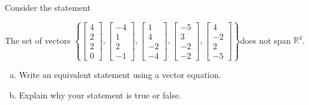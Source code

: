 
\begin{exerciseStatement}


Consider the statement 
\begin{center}\begin{minipage}{0.8\textwidth}
 The set of vectors \( \left\{ \left[\begin{array}{c}
4 \\
2 \\
2 \\
0
\end{array}\right] , \left[\begin{array}{c}
-4 \\
1 \\
2 \\
-1
\end{array}\right] , \left[\begin{array}{c}
1 \\
4 \\
-2 \\
-4
\end{array}\right] , \left[\begin{array}{c}
-5 \\
3 \\
-2 \\
-2
\end{array}\right] , \left[\begin{array}{c}
4 \\
-2 \\
2 \\
-5
\end{array}\right] \right\} \)does not span \(\mathbb{R}^4\). 
\end{minipage}\end{center}
    


\begin{enumerate}[(a)]
\item  Write an equivalent statement using a vector equation.
\item  Explain why your statement is true or false.
\end{enumerate}
    
\end{exerciseStatement}
    
